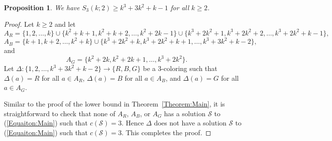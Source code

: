 \documentclass[10pt,a4paper]{amsart}
\newtheorem{proposition}{Proposition}
\begin{document}
\begin{proposition}
We have $S_3(k;2)\geq k^3+3k^2+k-1$ for all $k\geq2$.
\end{proposition}

\begin{proof}
Let $k\geq2$ and let
\[
A_R=\{1,2,\ldots,k\}\cup\{k^2+k+1,k^2+k+2,\ldots,k^2+2k-1\}\cup\{k^3+2k^2+1,k^3+2k^2+2,\ldots,k^3+2k^2+k-1\},
\]
\[
A_B=\{k+1,k+2,\ldots,k^2+k\}\cup\{k^3+2k^2+k,k^3+2k^2+k+1,\ldots,k^3+3k^2+k-2\},
\]
and
\[
A_G=\{k^2+2k,k^2+2k+1,\ldots,k^3+2k^2\}.
\]
Let $\Delta:\{1,2,\ldots,k^3+3k^2+k-2\}\to\{R,B,G\}$ be a $3$-coloring such that $\Delta(a)=R$ for all $a\in A_R$, $\Delta(a)=B$ for all $a\in A_B$, and $\Delta(a)=G$ for all $a\in A_G$.

Similar to the proof of the lower bound in Theorem~\ref{Theorem:Main}, it is straightforward to check that none of $A_R$, $A_B$, or $A_G$ has a solution $\mathcal{S}$ to (\ref{Equaiton:Main}) such that $c(\mathcal{S})=3$. Hence $\Delta$ does not have a solution $\mathcal{S}$ to (\ref{Equaiton:Main}) such that $c(\mathcal{S})=3$. This completes the proof.
\end{proof}
\end{document}
